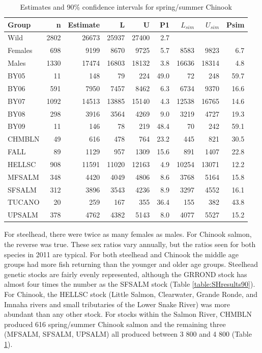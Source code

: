 \documentclass[%
                leqno,         %
%
]{nrc1}                          %
\begin{document}
\begin{table}
\caption{Estimates and 90\% confidence intervals for spring/summer Chinook}
\label{table:CHresults90} 
\begin{center}
\begin{tabular}{|l|r|r|r|r|r|r|r|r|}
\hline Group & n & Estimate & L & U & P1 & $L_{sim}$ & $U_{sim}$ & Psim \\ 
\hline  Wild&2802&26673  &25937 &27400  &2.7 &  &  & \\ 
\hline  Females&698&9199  &8670  &9725  &5.7 &8583  &9823  &6.7 \\ 
\hline  Males&1330&17474  &16803  &18132  &3.8 &16636  &18314  &4.8 \\ 
\hline  BY05&11&148  &79  &224  &49.0 &72  &248  & 59.7\\ 
\hline  BY06&591&7950  &7457  &8462  &6.3 &6734  &9370  &16.6 \\ 
\hline  BY07&1092&14513  &13885  &15140  &4.3 &12538  &16765  &14.6 \\ 
\hline  BY08&298& 3916 &3564  &4269  &9.0 &3219  &4727  & 19.3 \\ 
\hline  BY09&11&146  &78  &219  &48.4 &70  &242  &59.1 \\ 
\hline  CHMBLN&49&616  &478  &764  &23.2 &445  &821  &30.5 \\ 
\hline  FALL&89&1129  &957  &1309  &15.6 &891  &1407  &22.8 \\ 
\hline  HELLSC&908&11591  &11020  &12163  &4.9 &10254  &13071  & 12.2\\ 
\hline  MFSALM&348&4420  &4049  &4806  &8.6 &3768  &5164  &15.8 \\ 
\hline  SFSALM&312&3896  &3543  &4236  &8.9 &3297  &4552  &16.1 \\ 
\hline  TUCANO&20&259  &167 &355  &36.4 &155  &382  &43.8 \\ 
\hline  UPSALM&378&4762  &4382  &5143  &8.0 &4077  &5527  &15.2 \\ 
\hline 
\end{tabular}
\end{center}
\end{table}

For steelhead, there were twice as many females as males. For Chinook salmon, the reverse was true. These sex ratios vary annually, but the ratios seen for both species in 2011 are typical. For both steelhead and Chinook the middle age groups had more fish returning than the younger and older age groups. Steelhead genetic stocks are fairly evenly represented, although the GRROND stock has almost four times the number as the SFSALM stock (Table \ref{table:SHresults90}). For Chinook, the HELLSC stock (Little Salmon, Clearwater, Grande Ronde, and Imnaha rivers and small tributaries of the Lower Snake River) was more abundant than any other stock. For stocks within the Salmon River, CHMBLN produced 616 spring/summer Chinook salmon and the remaining three (MFSALM, SFSALM, UPSALM) all produced between 3 800 and 4 800 (Table \ref{table:CHresults90}). 
\end{document}

